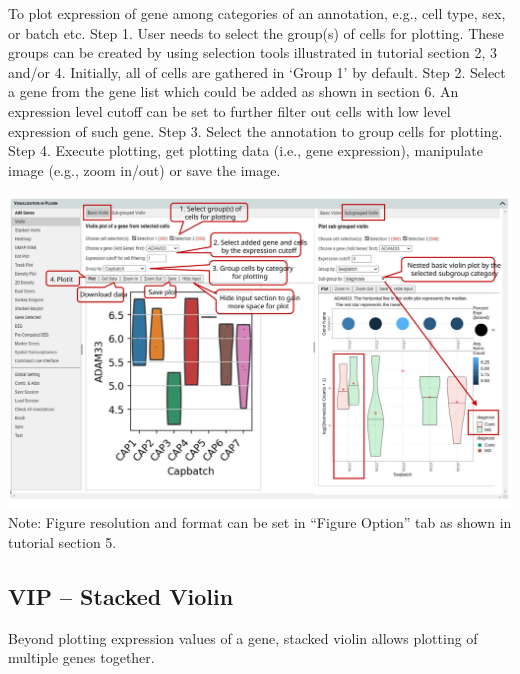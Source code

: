 \documentclass[
]{article}
\begin{document}
To plot expression of gene among categories of an annotation, e.g., cell type, sex, or batch etc.
Step 1. User needs to select the group(s) of cells for plotting. These groups can be created by using selection tools illustrated in tutorial section 2, 3 and/or 4. Initially, all of cells are gathered in `Group 1' by default.
Step 2. Select a gene from the gene list which could be added as shown in section 6. An expression level cutoff can be set to further filter out cells with low level expression of such gene.
Step 3. Select the annotation to group cells for plotting.
Step 4. Execute plotting, get plotting data (i.e., gene expression), manipulate image (e.g., zoom in/out) or save the image.

\includegraphics{figures/F7_label.svg}
Note: Figure resolution and format can be set in ``Figure Option'' tab as shown in tutorial section 5.

\hypertarget{vip-stacked-violin}{%
\subsection{VIP -- Stacked Violin}\label{vip-stacked-violin}}

Beyond plotting expression values of a gene, stacked violin allows plotting of multiple genes together.
\end{document}
